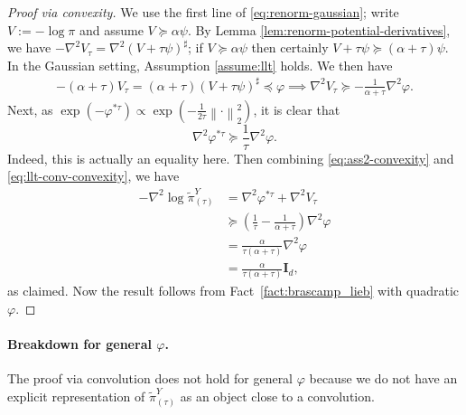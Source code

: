 \documentclass[11pt]{article}
\newcommand{\norm}[1]{\left\lVert#1\right\rVert}
\newcommand{\Par}[1]{\left(#1\right)}
\newcommand{\mi}{\mathbf{I}}
\newcommand{\0}{\mathbf{0}}
\newcommand{\1}{\mathbf{1}}
\newcommand{\vhi}{\varphi}
\newcommand{\tpi}{\tilde{\pi}}
\begin{document}
\begin{proof}[Proof via convexity]
    We use the first line of \eqref{eq:renorm-gaussian}; write $V:=-\log \pi$ and assume $V\succeq \alpha\psi$.  By Lemma \ref{lem:renorm-potential-derivatives}, we have $-\nabla^2 V_\tau=\nabla^2(V+\tau \psi)^\sharp$; if $V\succeq \alpha\psi$ then certainly $V+\tau\psi\succeq (\alpha+\tau)\psi$.  In the Gaussian setting, Assumption \ref{assume:llt} holds.  We then have 
\begin{equation}\label{eq:ass2-convexity}
    \begin{aligned}
        -(\alpha+\tau)V_\tau=(\alpha+\tau) (V+\tau\psi)^\sharp \preceq \vhi
        \implies \nabla^2 V_\tau \succeq -\frac{1}{\alpha+\tau}\nabla^2 \vhi.
    \end{aligned}
\end{equation} 
Next, as $\exp\Par{-\vhi^{*\tau }}\propto \exp(-\frac{1}{2\tau}\norm{\cdot}_2^2)$, it is clear that 
\begin{equation}\label{eq:llt-conv-convexity}
    \nabla^2 \vhi^{*\tau}\succeq  \frac{1}{\tau}\nabla^2\vhi.
\end{equation}
Indeed, this is actually an equality here.  Then combining \eqref{eq:ass2-convexity} and \eqref{eq:llt-conv-convexity}, we have
\begin{align*}
    -\nabla^2 \log \tpi_{(\tau)}^Y
    &=\nabla^2 \varphi^{*\tau}+\nabla^2 V_\tau\\
    &\succeq \Par{\frac{1}{\tau}-\frac{1}{\alpha+\tau}}\nabla^2 \varphi\\
    &=\frac{\alpha}{\tau(\alpha+\tau)}\nabla^2 \varphi\\
    &=\frac{\alpha}{\tau(\alpha+\tau)}\mi_d,
\end{align*}
as claimed. Now the result follows from Fact~\ref{fact:brascamp_lieb} with quadratic $\vhi$.
\end{proof}

\paragraph{Breakdown for general $\vhi$.}
The proof via convolution does not hold for general $\vhi$ because we do not have an explicit representation of $\tpi_{(\tau)}^Y$ as an object close to a convolution.  
\end{document}
